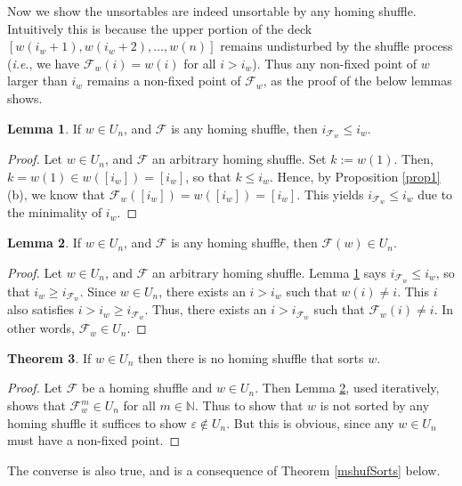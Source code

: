 \documentclass[final,nomarks]{dmtcs-episciences}
\theoremstyle{definition}
\newtheorem{thm}{Theorem}[section]
\newtheorem{lem}[thm]{Lemma}
\theoremstyle{definition}
\theoremstyle{remark}
\newcommand{\f}{\mathcal{F}} %
\newcommand{\fw}{\mathcal{F}_w} %
\newcommand{\NN}{\mathbb{N}}
\newcommand{\tup}[1]{\left( #1 \right)}
\begin{document}
Now we show the unsortables are indeed unsortable by any homing shuffle. Intuitively this is because the upper portion of the deck $[w\tup{i_w+1},w\tup{i_w+2},\dots,w\tup{n}]$ remains undisturbed by the shuffle process (\textit{i.e}., we have $\fw\tup{i} = w(i)$ for all $i > i_w$). Thus any non-fixed point of $w$ larger than $i_w$ remains a non-fixed point of $\fw$, as the proof of the below lemmas shows.

\begin{lem}
\label{i-decreases}
If $w \in U_n$, and $\f$ is any homing shuffle, then $i_{\fw} \leq i_w$.
\end{lem}

\begin{proof}
Let $w \in U_n$, and $\f$ an arbitrary homing shuffle. Set $k := w(1)$. Then, $k = w(1) \in w([i_w]) = [i_w]$, so that $k \le i_w$. Hence, by Proposition \ref{prop1} (b), we know that $\fw([i_w]) = w([i_w]) = [i_w]$. This yields $i_{\fw} \le i_w$ due to the minimality of $i_w$.
\end{proof}

\begin{lem}
    \label{LtoL}
   If $w \in U_n$, and $\f$ is any homing shuffle, then $\f(w) \in U_n$. 
\end{lem}

\begin{proof}
Let $w \in U_n$, and $\f$ an arbitrary homing shuffle.
Lemma \ref{i-decreases} says $i_{\fw} \le i_w$, so that $i_w \ge i_{\fw}$.
Since $w \in U_n$, there exists an $i > i_w$ such that $w(i) \ne i$.
This $i$ also satisfies $i > i_w \ge i_{\fw}$.
Thus, there exists an $i > i_{\fw}$ such that $\fw(i) \ne i$.
In other words, $\fw \in U_n$.
\end{proof}

\begin{thm}
    \label{thm.Un-hopeless}
    If $ w \in U_{n} $ then there is no homing shuffle that sorts $w$.
\end{thm}

\begin{proof}
Let $\f$ be a homing shuffle and $w \in U_n$. Then Lemma \ref{LtoL}, used iteratively, shows that $\fw^m \in U_n$ for all $m \in \NN$. Thus to show that $w$ is not sorted by any homing shuffle it suffices to show $\varepsilon \notin U_n$. But this is obvious, since any $w \in U_n$ must have a non-fixed point.
\end{proof}

The converse is also true, and is a consequence of Theorem \ref{mshufSorts} below.
\end{document}
